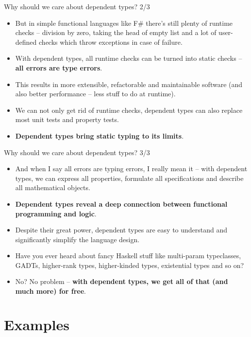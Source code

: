 \documentclass{beamer}
\begin{document}
\begin{frame}{Why should we care about dependent types? 2/3}
\begin{itemize}
	\item But in simple functional languages like F\# there's still plenty of runtime checks -- division by zero, taking the head of empty list and a lot of user-defined checks which throw exceptions in case of failure.
	\item With dependent types, all runtime checks can be turned into static checks -- \textbf{all errors are type errors}.
	\item This results in more extensible, refactorable and maintainable software (and also better performance -- less stuff to do at runtime).\item We can not only get rid of runtime checks, dependent types can also replace most unit tests and property tests.
	\item \textbf{Dependent types bring static typing to its limits}.
\end{itemize}
\end{frame}

\begin{frame}{Why should we care about dependent types? 3/3}
\begin{itemize}
	\item And when I say all errors are typing errors, I really mean it -- with dependent types, we can express all properties, formulate all specifications and describe all mathematical objects.
	\item \textbf{Dependent types reveal a deep connection between functional programming and logic}.
	\item Despite their great power, dependent types are easy to understand and significantly simplify the language design.
	\item Have you ever heard about fancy Haskell stuff like multi-param typeclasses, GADTs, higher-rank types, higher-kinded types, existential types and so on?
	\item No? No problem -- \textbf{with dependent types, we get all of that (and much more) for free}.
\end{itemize}
\end{frame}

\section{Examples}
\end{document}
